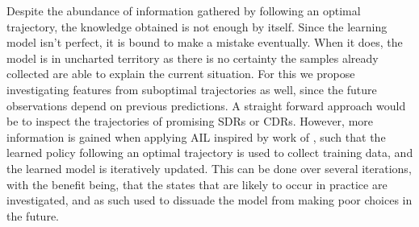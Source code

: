 \documentclass[twocolumn]{svjour3}
\begin{document}
Despite the abundance of information gathered by following an optimal 
trajectory, the knowledge obtained is not enough by itself. Since the learning 
model isn't perfect, it is bound to make a mistake eventually. When it does, 
the model is in uncharted territory as there is no certainty the samples 
already collected are able to explain the current situation. For this we 
propose investigating features from suboptimal trajectories as well, since the 
future observations depend on previous predictions. 
A straight forward approach would be to inspect the trajectories of promising 
SDRs or CDRs. However, more information is gained when applying AIL inspired by 
work of \cite{RossB10,RossGB11}, such that the 
learned policy following an optimal trajectory is used to collect training 
data, and the learned model is iteratively updated. 
This can be done over several iterations, with the benefit being, that the 
states that are likely to occur in practice are investigated, and as such used 
to dissuade the model from making poor choices in the future.
 
\end{document}
